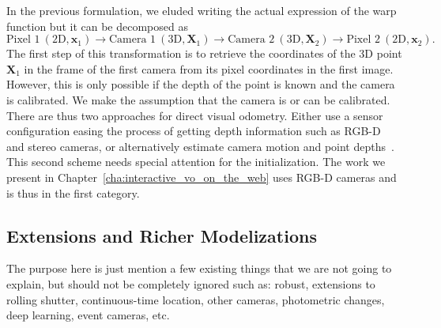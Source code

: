 In the previous formulation, we eluded writing the actual expression of the warp function
but it can be decomposed as
\[
	\text{Pixel 1}\ (\text{2D}, \bm{x}_1)
		\longrightarrow
			\text{Camera 1}\ (\text{3D}, \bm{X}_1)
		\longrightarrow
			\text{Camera 2}\ (\text{3D}, \bm{X}_2)
		\longrightarrow
			\text{Pixel 2}\ (\text{2D}, \bm{x}_2).
\]
The first step of this transformation is to retrieve the coordinates
of the 3D point $\bm{X}_1$ in the frame of the first camera
from its pixel coordinates in the first image.
However, this is only possible if the depth of the point is known
and the camera is calibrated.
We make the assumption that the camera is or can be calibrated.
There are thus two approaches for direct visual odometry.
Either use a sensor configuration easing the process of getting depth information
such as RGB-D~\cite{kerl2013robust} and stereo cameras,
or alternatively estimate camera motion and point depths~\cite{engel2017direct}.
This second scheme needs special attention for the initialization.
The work we present in Chapter~\ref{cha:interactive_vo_on_the_web}
uses RGB-D cameras and is thus in the first category.

\subsection{Extensions and Richer Modelizations}%
\label{sub:vo_extensions}

The purpose here is just mention a few existing things that we are not going to explain,
but should not be completely ignored such as:
robust, extensions to rolling shutter, continuous-time location, other cameras, photometric changes,
deep learning, event cameras, etc.
